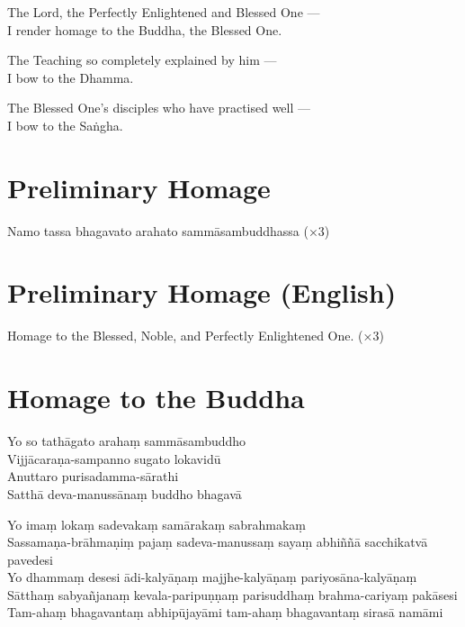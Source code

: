 The Lord, the Perfectly Enlightened and Blessed One ---\\
I render homage to the Buddha, the Blessed One.

The Teaching so completely explained by him ---\\
I bow to the Dhamma.

The Blessed One's disciples who have practised well ---\\
I bow to the Saṅgha.

\section*{Preliminary Homage}

\begin{leader}
\end{leader}

Namo tassa bhagavato arahato sammāsambuddhassa (×3)

\section*{Preliminary Homage (English)}

\begin{leader}
\end{leader}

Homage to the Blessed, Noble, and Perfectly Enlightened One. (×3)

\section*{Homage to the Buddha}

\begin{leader}
\end{leader}

Yo so tathāgato arahaṃ sammāsambuddho\\
Vijjācaraṇa-sampanno sugato lokavidū\\
Anuttaro purisadamma-sārathi\\
Satthā deva-manussānaṃ buddho bhagavā

Yo imaṃ lokaṃ sadevakaṃ samārakaṃ sabrahmakaṃ\\
Sassamaṇa-brāhmaṇiṃ pajaṃ sadeva-manussaṃ sayaṃ abhiññā sacchikatvā pavedesi\\
Yo dhammaṃ desesi ādi-kalyāṇaṃ majjhe-kalyāṇaṃ pariyosāna-kalyāṇaṃ\\
Sātthaṃ sabyañjanaṃ kevala-paripuṇṇaṃ parisuddhaṃ brahma-cariyaṃ pakāsesi\\
Tam-ahaṃ bhagavantaṃ abhipūjayāmi tam-ahaṃ bhagavantaṃ sirasā namāmi

